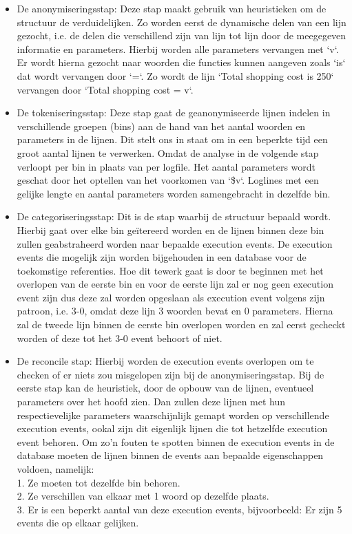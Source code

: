 \begin{itemize}
    \item De anonymiseringsstap: Deze stap maakt gebruik van heuristieken om de structuur de verduidelijken. Zo worden eerst de dynamische delen van een lijn gezocht, i.e. de delen die verschillend zijn van lijn tot lijn door de meegegeven informatie en parameters. Hierbij worden alle parameters vervangen met `v`. Er wordt hierna gezocht naar woorden die functies kunnen aangeven zoals `is` dat wordt vervangen door `=`. Zo wordt de lijn `Total shopping cost is 250` vervangen door `Total shopping cost = v`.
    \item De tokeniseringsstap: Deze stap gaat de geanonymiseerde lijnen indelen in verschillende groepen (bins) aan de hand  van het aantal woorden en parameters in de lijnen. Dit stelt ons in staat om in een beperkte tijd een groot aantal lijnen te verwerken. Omdat de analyse in de volgende stap verloopt per bin in plaats van per logfile. Het aantal parameters wordt geschat door het optellen van het voorkomen van `\$v`. Loglines met een gelijke lengte en aantal parameters worden samengebracht in dezelfde bin.
    \item De categoriseringsstap: Dit is de stap waarbij de structuur bepaald wordt. Hierbij gaat over elke bin geïtereerd worden en de lijnen binnen deze bin zullen geabstraheerd worden naar bepaalde execution events. De execution events die mogelijk zijn worden bijgehouden in een database voor de toekomstige referenties. Hoe dit tewerk gaat is door te beginnen met het overlopen van de eerste bin en voor de eerste lijn zal er nog geen execution event zijn dus deze zal worden opgeslaan als execution event volgens zijn patroon, i.e. 3-0, omdat deze lijn 3 woorden bevat en 0 parameters. Hierna zal de tweede lijn binnen de eerste bin overlopen worden en zal eerst gecheckt worden of deze tot het 3-0 event behoort of niet.
    \item De reconcile stap: Hierbij worden de execution events overlopen om te checken of er niets zou misgelopen zijn bij de anonymiseringsstap. Bij de eerste stap kan de heuristiek, door de opbouw van de lijnen, eventueel parameters over het hoofd zien. Dan zullen deze lijnen met hun respectievelijke parameters waarschijnlijk gemapt worden op verschillende execution events, ookal zijn dit eigenlijk lijnen die tot hetzelfde execution event behoren. Om zo'n fouten te spotten binnen de execution events in de database moeten de lijnen binnen de events aan bepaalde eigenschappen voldoen, namelijk:\\
    1. Ze moeten tot dezelfde bin behoren. \\
    2. Ze verschillen van elkaar met 1 woord op dezelfde plaats. \\
    3. Er is een beperkt aantal van deze execution events, bijvoorbeeld: Er zijn 5 events die op elkaar gelijken. \\
\end{itemize}

